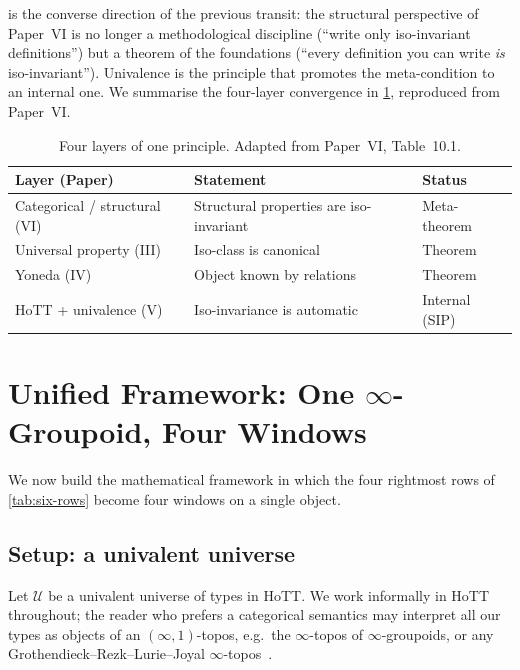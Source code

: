 \documentclass[12pt]{article}
\theoremstyle{definition}
\theoremstyle{remark}
\newcommand{\U}{\mathcal{U}}
\begin{document}
 is the converse direction of the previous transit:
the structural perspective of Paper~VI is no longer a methodological
discipline (``write only iso-invariant definitions'') but a theorem of the
foundations (``every definition you can write \emph{is} iso-invariant'').
Univalence is the principle that promotes the meta-condition to an
internal one. We summarise the four-layer convergence in
\cref{tab:four-layers}, reproduced from Paper~VI.

\begin{table}[ht]
\centering
\begin{tabularx}{\textwidth}{l X l}
\toprule
\textbf{Layer (Paper)} & \textbf{Statement} & \textbf{Status} \\
\midrule
Categorical / structural (VI) & Structural properties are iso-invariant
& Meta-theorem \\
Universal property (III) & Iso-class is canonical & Theorem \\
Yoneda (IV) & Object known by relations & Theorem \\
HoTT + univalence (V) & Iso-invariance is automatic & Internal (SIP) \\
\bottomrule
\end{tabularx}
\caption{Four layers of one principle. Adapted from Paper~VI,
Table~10.1.}
\label{tab:four-layers}
\end{table}

\section{Unified Framework: One \texorpdfstring{$\infty$}{Infinity}-Groupoid, Four Windows}
\label{sec:framework}

We now build the mathematical framework in which the four rightmost rows
of \cref{tab:six-rows} become four windows on a single object.

\subsection{Setup: a univalent universe}
\label{sec:setup-univ}

Let $\U$ be a univalent universe of types in HoTT. We work informally in
HoTT throughout; the reader who prefers a categorical semantics may
interpret all our types as objects of an $(\infty,1)$-topos, e.g.\ the
$\infty$-topos of $\infty$-groupoids, or any
Grothendieck--Rezk--Lurie--Joyal $\infty$-topos~\cite{lurie,ShulmanInftyTopos}.
\end{document}
